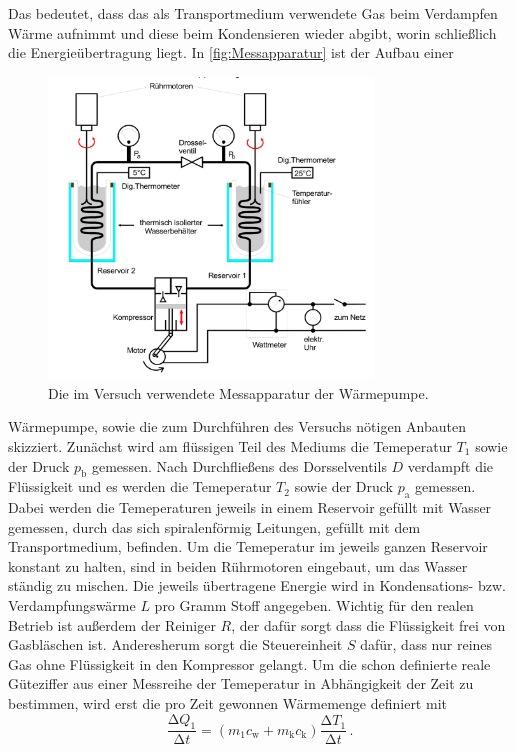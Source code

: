Das bedeutet, dass das als Transportmedium verwendete Gas beim Verdampfen Wärme 
aufnimmt und diese beim Kondensieren wieder abgibt, worin schließlich die
Energieübertragung liegt. In \autoref{fig:Messapparatur} ist der Aufbau einer
\begin{figure}
    \centering
    \includegraphics[height=8cm]{messdaten/Messapparatur.png}
    \caption{Die im Versuch verwendete Messapparatur der Wärmepumpe. \cite{V206_Anleitung}}
    \label{fig:Messapparatur}
\end{figure}
Wärmepumpe, sowie die zum Durchführen des Versuchs nötigen Anbauten skizziert.
Zunächst wird am flüssigen Teil des Mediums die Temeperatur $T_1$ sowie der Druck
$p_\text{b}$ gemessen. Nach Durchfließens des Dorsselventils $D$ verdampft die 
Flüssigkeit und es werden die Temeperatur $T_2$ sowie der Druck $p_\text{a}$ 
gemessen. Dabei werden die Temeperaturen jeweils in einem Reservoir gefüllt mit 
Wasser gemessen, durch das sich spiralenförmig Leitungen, gefüllt mit dem Transportmedium,
befinden. Um die Temeperatur im jeweils ganzen Reservoir konstant zu halten, sind in beiden 
Rührmotoren eingebaut, um das Wasser ständig zu mischen. Die jeweils übertragene Energie
wird in Kondensations- bzw. Verdampfungswärme $L$ pro Gramm Stoff angegeben.
Wichtig für den realen Betrieb ist außerdem der Reiniger $R$, der dafür sorgt dass die
Flüssigkeit frei von Gasbläschen ist. Anderesherum sorgt die Steuereinheit $S$ dafür,
dass nur reines Gas ohne Flüssigkeit in den Kompressor gelangt.
Um die schon definierte reale Güteziffer aus einer Messreihe der Temeperatur in 
Abhängigkeit der Zeit zu bestimmen, wird erst die pro Zeit gewonnen Wärmemenge definiert mit
\begin{equation*}
    \frac{\increment Q_1}{\increment t}=(m_1c_\text{w}+m_\text{k}c_\text{k})\frac{\increment T_1}{\increment t}\,.
\end{equation*}
